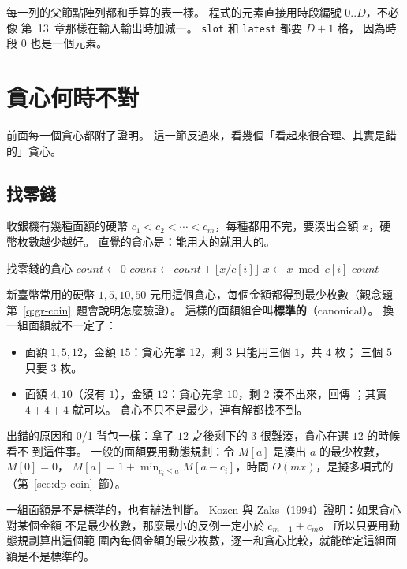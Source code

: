 每一列的父節點陣列都和手算的表一樣。 程式的元素直接用時段編號 $0..D$，不必像
第~13~章那樣在輸入輸出時加減一。 \texttt{slot} 和 \texttt{latest} 都要 $D + 1$ 格，
因為時段 $0$ 也是一個元素。

\section{貪心何時不對}
\label{sec:gr-fail}

前面每一個貪心都附了證明。 這一節反過來，看幾個「看起來很合理、其實是錯的」貪心。

\subsection{找零錢}

收銀機有幾種面額的硬幣 $c_1 < c_2 < \cdots < c_m$，每種都用不完，要湊出金額 $x$，硬
幣枚數越少越好。 直覺的貪心是：能用大的就用大的。

\begin{pseudo}[label=alg:gr-change]{找零錢的貪心}
    \State $\mathit{count} \gets 0$
        \State $\mathit{count} \gets \mathit{count} + \lfloor x / c[i] \rfloor$
        \State $x \gets x \bmod c[i]$
    \EndFor
        \State \Return \NIL {}
    \EndIf
    \State \Return $\mathit{count}$
\EndFunction
\end{pseudo}

新臺幣常用的硬幣 $1, 5, 10, 50$ 元用這個貪心，每個金額都得到最少枚數（觀念題
第~\ref{q:gr-coin}~題會說明怎麼驗證）。 這樣的面額組合叫\textbf{標準的}（canonical）。
換一組面額就不一定了：

\begin{itemize}
\item 面額 $1, 5, 12$，金額 $15$：貪心先拿 $12$，剩 $3$ 只能用三個 $1$，共 $4$ 枚；
三個 $5$ 只要 $3$ 枚。
\item 面額 $4, 10$（沒有 $1$），金額 $12$：貪心先拿 $10$，剩 $2$ 湊不出來，回傳
\NIL；其實 $4 + 4 + 4$ 就可以。 貪心不只不是最少，連有解都找不到。
\end{itemize}

出錯的原因和 0/1 背包一樣：拿了 $12$ 之後剩下的 $3$ 很難湊，貪心在選 $12$ 的時候看不
到這件事。 一般的面額要用動態規劃：令 $M[a]$ 是湊出 $a$ 的最少枚數，$M[0] = 0$，
$M[a] = 1 + \min_{c_i \le a} M[a - c_i]$，時間 $O(mx)$，是擬多項式的（第~\ref{sec:dp-coin}~節）。

一組面額是不是標準的，也有辦法判斷。 Kozen 與 Zaks（1994）證明：如果貪心對某個金額
不是最少枚數，那麼最小的反例一定小於 $c_{m-1} + c_m$。 所以只要用動態規劃算出這個範
圍內每個金額的最少枚數，逐一和貪心比較，就能確定這組面額是不是標準的。

